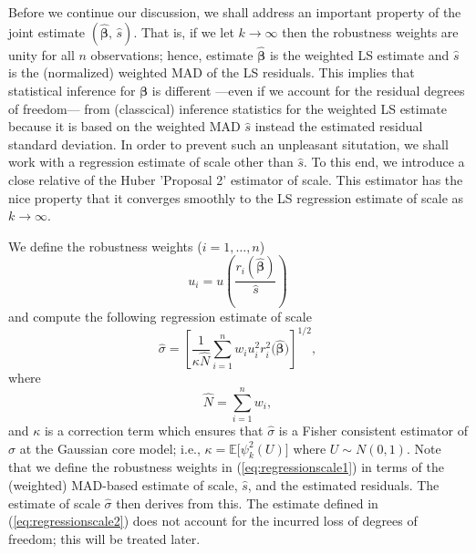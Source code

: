 \documentclass[a4paper,oneside,11pt,DIV=12]{scrartcl}
\theoremstyle{remark}
\begin{document}
Before we continue our discussion, we shall address an important property of the joint estimate $(\widehat{\bm \beta}, \, \widehat{s})$. That is, if we let $k \rightarrow \infty$ then the robustness weights are unity for all $n$ observations; hence, estimate $\widehat{\bm \beta}$ is the weighted LS estimate and $\widehat{s}$ is the (normalized) weighted MAD of the LS residuals. This implies that statistical inference for $\bm \beta$ is different ---even if we account for the residual degrees of freedom--- from (classcical) inference statistics for the weighted LS estimate because it is based  on the weighted MAD $\widehat{s}$ instead the estimated residual standard deviation. In order to prevent such an unpleasant situtation, we shall work with a regression estimate of scale other than $\widehat{s}$. To this end, we introduce a close relative of the Huber 'Proposal 2' estimator of scale. This estimator has the nice property that it converges smoothly to the LS regression estimate of scale as $k \rightarrow \infty$.  

We define the robustness weights ($i=1, \ldots, n$)
\begin{equation}\label{eq:regressionscale1}
   u_i = u\left(\frac{r_i(\widehat{\bm \beta})}{\widehat{s}}\right)
\end{equation}
\noindent and compute the following regression estimate of scale
\begin{equation}\label{eq:regressionscale2}
   \widehat{\sigma} = \left[ \frac{1}{\kappa \widehat{N}}\sum_{i=1}^n w_i u_i^2 r_i^2\big(\widehat{\bm \beta}\big) \right]^{1/2}, 
\end{equation}
\noindent where 
\begin{equation*}
   \widehat{N} = \sum_{i=1}^n w_i,
\end{equation*}
\noindent and $\kappa$ is a correction term which ensures that $\widehat{\sigma}$ is a Fisher consistent estimator of $\sigma$ at the Gaussian core model; i.e., $\kappa = \mathbb{E}\big[\psi_k^2(U)\big]$ where $U \sim N(0,1)$. Note that we define the robustness weights in (\ref{eq:regressionscale1}) in terms of the (weighted) MAD-based estimate of scale, $\widehat{s}$, and the estimated residuals. The estimate of scale $\widehat{\sigma}$ then derives from this. The estimate defined in (\ref{eq:regressionscale2}) does not account for the incurred loss of degrees of freedom; this will be treated later. 
\end{document}
